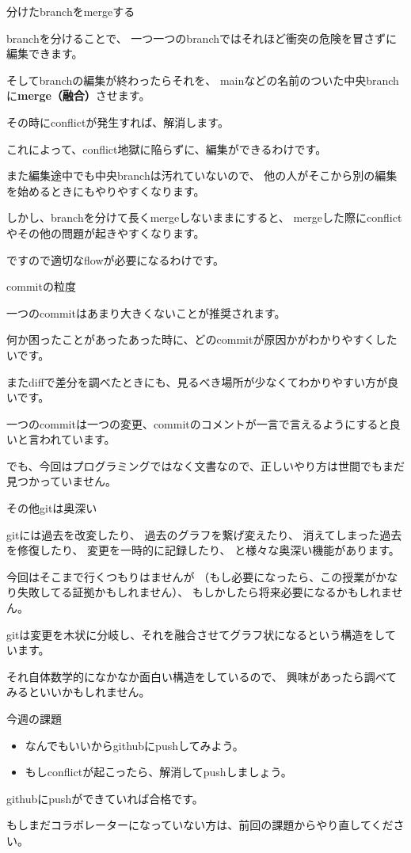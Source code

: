 \documentclass[12pt, unicode]{beamer}
\begin{document}
\begin{frame}{分けたbranchをmergeする}

branchを分けることで、
一つ一つのbranchではそれほど衝突の危険を冒さずに編集できます。

そしてbranchの編集が終わったらそれを、
mainなどの名前のついた中央branchに\textbf{merge（融合）}させます。

その時にconflictが発生すれば、解消します。

これによって、conflict地獄に陥らずに、編集ができるわけです。

また編集途中でも中央branchは汚れていないので、
他の人がそこから別の編集を始めるときにもやりやすくなります。

しかし、branchを分けて長くmergeしないままにすると、
mergeした際にconflictやその他の問題が起きやすくなります。

ですので適切なflowが必要になるわけです。

\end{frame}
\begin{frame}{commitの粒度}

一つのcommitはあまり大きくないことが推奨されます。

何か困ったことがあったあった時に、どのcommitが原因かがわかりやすくしたいです。

またdiffで差分を調べたときにも、見るべき場所が少なくてわかりやすい方が良いです。

一つのcommitは一つの変更、commitのコメントが一言で言えるようにすると良いと言われています。

でも、今回はプログラミングではなく文書なので、正しいやり方は世間でもまだ見つかっていません。

\end{frame}
\begin{frame}{その他gitは奥深い}

gitには過去を改変したり、
過去のグラフを繋げ変えたり、
消えてしまった過去を修復したり、
変更を一時的に記録したり、
と様々な奥深い機能があります。

今回はそこまで行くつもりはませんが
（もし必要になったら、この授業がかなり失敗してる証拠かもしれません）、
もしかしたら将来必要になるかもしれません。

gitは変更を木状に分岐し、それを融合させてグラフ状になるという構造をしています。

それ自体数学的になかなか面白い構造をしているので、
興味があったら調べてみるといいかもしれません。

\end{frame}

\begin{frame}{今週の課題}

\begin{itemize}
\item なんでもいいからgithubにpushしてみよう。
\item もしconflictが起こったら、解消してpushしましょう。
\end{itemize}

githubにpushができていれば合格です。

もしまだコラボレーターになっていない方は、前回の課題からやり直してください。

\end{frame}
\end{document}
